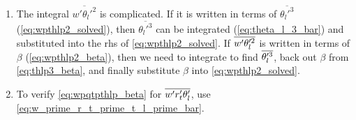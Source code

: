 \begin{enumerate}
    \item\label{itm:checkingstep_7}
    The integral $\overline{w'\theta_l'^2}$ is complicated.
    If it is written in terms of $\overline{\theta_l'^3}$ (\cref{eq:wpthlp2_solved}), then $\overline{\theta_l'^3}$ can be integrated (\cref{eq:theta_l_3_bar}) and substituted into the \gls{rhs} of \cref{eq:wpthlp2_solved}.
    If $\overline{w' \theta_l'^2}$ is written in terms of $\beta$ (\cref{eq:wpthlp2_beta}), then we need to integrate to find $\overline{\theta_l'^3}$, back out $\beta$ from \cref{eq:thlp3_beta}, and finally substitute $\beta$ into \cref{eq:wpthlp2_solved}.

    \item\label{itm:checkingstep_8}
    To verify \cref{eq:wpqtpthlp_beta} for $\overline{w' r_t' \theta_l'}$, use \cref{eq:w_prime_r_t_prime_t_l_prime_bar}.
\end{enumerate}
